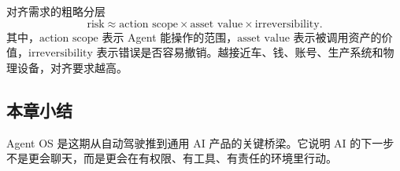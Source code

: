 \begin{knowledgebox}{对齐需求的粗略分层}
\[
\text{risk} \approx \text{action scope} \times \text{asset value} \times \text{irreversibility}.
\]
其中，\(\text{action scope}\) 表示 Agent 能操作的范围，\(\text{asset value}\) 表示被调用资产的价值，\(\text{irreversibility}\) 表示错误是否容易撤销。越接近车、钱、账号、生产系统和物理设备，对齐要求越高。
\end{knowledgebox}

\subsection{本章小结}

Agent OS 是这期从自动驾驶推到通用 AI 产品的关键桥梁。它说明 AI 的下一步不是更会聊天，而是更会在有权限、有工具、有责任的环境里行动。

